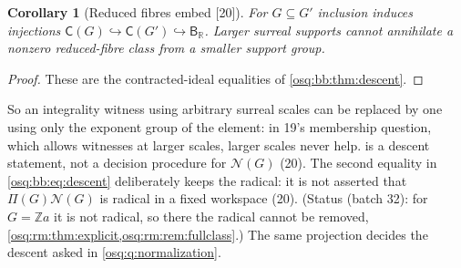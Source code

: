 \documentclass[11pt,letterpaper]{article}
\numberwithin{equation}{section}
\newtheorem{corollary}[corollary]{Corollary}
\theoremstyle{definition}
\theoremstyle{remark}
\theoremstyle{plain}
\newcommand{\Z}{\mathbb Z}
\newcommand{\R}{\mathbb R}
\newcommand{\NN}{\mathcal N}         %
\newcommand{\src}[1]{\textup{\textsf{[#1]}}}
\begin{document}
\begin{corollary}[Reduced fibres embed \src{20}]\label{osq:bb:cor:localinjection}
For $G\subseteq G'$ inclusion induces injections $\mathsf C(G)\hookrightarrow\mathsf C(G')\hookrightarrow\mathsf B_\R$. Larger surreal
supports cannot annihilate a nonzero reduced-fibre class from a smaller support group.
\end{corollary}
\begin{proof}
These are the contracted-ideal equalities of \cref{osq:bb:thm:descent}.
\end{proof}

So an integrality witness using arbitrary surreal scales can be replaced by one using only the exponent group of the element: in
19's membership question, which allows witnesses at larger scales, larger scales never help.  is a
descent statement, not a decision procedure for $\NN(G)$ (20). The second equality in \eqref{osq:bb:eq:descent} deliberately keeps
the radical: it is not asserted that $\Pi(G)\NN(G)$ is radical in a fixed workspace (20). (Status (batch 32): for $G=\Z a$ it is
not radical, so there the radical cannot be removed, \cref{osq:rm:thm:explicit,osq:rm:rem:fullclass}.) The same projection decides the descent
asked in \cref{osq:q:normalization}.
\end{document}
